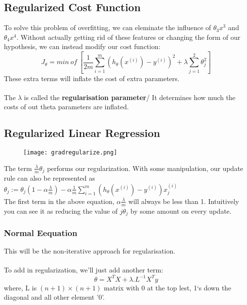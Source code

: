   \subsection{Regularized Cost Function}
    To solve this problem of overfitting, we can eleminate the influence of $\theta_3x^3$ and $\theta_4x^4$. Without actually getting rid of these features or changing the form of our hypothesis, we can instead modify our cost function:
    \begin{equation}
      J_\theta = min\ of\ \left[ \frac{1}{2m} \sum_{i=1}^{m}(h_\theta(x^{(i)}) - y^{(i)})^2 + \lambda\sum_{j=1}^2\theta_j^2 \right]
    \end{equation}
    These extra terms will inflate the cost of extra parameters. \\ \\
    The $\lambda$ is called the \textbf{regularisation parameter}/ It determines how much the costs of out theta parameters are inflated.

  \subsection{Regularized Linear Regression}
    \begin{figure}[h]
      \centering
      \texttt{[image: gradregularize.png]}
    \end{figure}


    The term $\frac{\lambda}{m}\theta_{j}$ performs our regularization. With some manipulation, our update rule can also be represented as \\

    $ \theta_j := \theta_j(1 - \alpha\frac{\lambda}{m}) - \alpha\frac{1}{m}\sum_{i=1}^m(h_\theta(x^{(i)}) - y^{(i)})x_j^{(i)} $\\

    The first term in the above equation, $\alpha\frac{\lambda}{m}$ will always be less than 1. Intuitively you can see it as reducing the value of $j\theta_j$ by some amount on every update.

    \subsubsection{Normal Eequation}
      This will be the non-iterative approach for regularisation.\\\\
      To add in regularization, we'll just add another term:
      \begin{equation}
        \theta = X^T X + \lambda . L^{-1} X^T y
      \end{equation}
      where, L is $(n+1)\times(n+1)$ matrix with 0 at the top lest, 1`s down the diagonal and all other element '0'.
